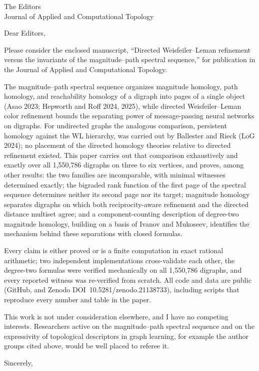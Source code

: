 \documentclass[11pt]{letter}
\begin{document}
\begin{letter}{The Editors\\Journal of Applied and Computational Topology}

\opening{Dear Editors,}

Please consider the enclosed manuscript, ``Directed Weisfeiler--Leman
refinement versus the invariants of the magnitude--path spectral
sequence,'' for publication in the Journal of Applied and Computational
Topology.

The magnitude--path spectral sequence organizes magnitude homology, path
homology, and reachability homology of a digraph into pages of a single
object (Asao 2023; Hepworth and Roff 2024, 2025), while directed
Weisfeiler--Leman color refinement bounds the separating power of
message-passing neural networks on digraphs. For undirected graphs the
analogous comparison, persistent homology against the WL hierarchy, was
carried out by Ballester and Rieck (LoG 2024); no placement of the
directed homology theories relative to directed refinement existed. This
paper carries out that comparison exhaustively and exactly over all
1,550,786 digraphs on three to six vertices, and proves, among other
results: the two families are incomparable, with minimal witnesses
determined exactly; the bigraded rank function of the first page of the
spectral sequence determines neither its second page nor its target;
magnitude homology separates digraphs on which both reciprocity-aware
refinement and the directed distance multiset agree; and a
component-counting description of degree-two magnitude homology,
building on a basis of Ivanov and Mukoseev, identifies the mechanism
behind these separations with closed formulas.

Every claim is either proved or is a finite computation in exact
rational arithmetic; two independent implementations cross-validate
each other, the degree-two formulas were verified mechanically on all
1,550,786 digraphs, and every reported witness was re-verified from
scratch. All code and data are public (GitHub, and Zenodo
DOI~10.5281/zenodo.21138733), including scripts that reproduce every
number and table in the paper.

This work is not under consideration elsewhere, and I have no competing
interests. Researchers active on the magnitude--path spectral sequence
and on the expressivity of topological descriptors in graph learning,
for example the author groups cited above, would be well placed to
referee it.

\closing{Sincerely,}
\end{letter}
\end{document}
